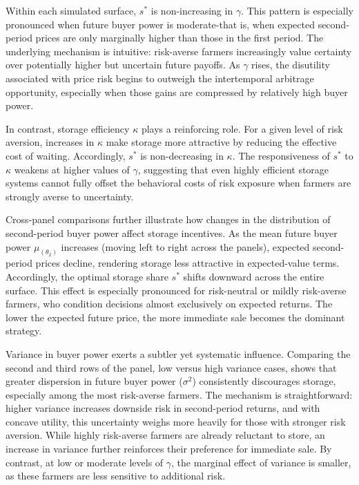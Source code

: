 Within each simulated surface, $s^*$ is non-increasing in $\gamma$. This pattern is especially pronounced when future buyer power is moderate-that is, when expected second-period prices are only marginally higher than those in the first period. The underlying mechanism is intuitive: risk-averse farmers increasingly value certainty over potentially higher but uncertain future payoffs. As $\gamma$ rises, the disutility associated with price risk begins to outweigh the intertemporal arbitrage opportunity, especially when those gains are compressed by relatively high buyer power.



In contrast, storage efficiency $\kappa$ plays a reinforcing role. For a given level of risk aversion, increases in $\kappa$ make storage more attractive by reducing the effective cost of waiting. Accordingly, $s^*$ is non-decreasing in $\kappa$. The responsiveness of $s^*$ to $\kappa$ weakens at higher values of $\gamma$, suggesting that even highly efficient storage systems cannot fully offset the behavioral costs of risk exposure when farmers are strongly averse to uncertainty. 


Cross-panel comparisons further illustrate how changes in the distribution of second-period buyer power affect storage incentives. As the mean future buyer power $\mu_{(\theta_2)}$ increases (moving left to right across the panels), expected second-period prices decline, rendering storage less attractive in expected-value terms. Accordingly, the optimal storage share $s^*$ shifts downward across the entire surface. This effect is especially pronounced for risk-neutral or mildly risk-averse farmers, who condition decisions almost exclusively on expected returns. The lower the expected future price, the more immediate sale becomes the dominant strategy.


Variance in buyer power exerts a subtler yet systematic influence. Comparing the second and third rows of the panel, low versus high variance cases, shows that greater dispersion in future buyer power ($\sigma^2$) consistently discourages storage, especially among the most risk-averse farmers. The mechanism is straightforward: higher variance increases downside risk in second-period returns, and with concave utility, this uncertainty weighs more heavily for those with stronger risk aversion. While highly risk-averse farmers are already reluctant to store, an increase in variance further reinforces their preference for immediate sale. By contrast, at low or moderate levels of $\gamma$, the marginal effect of variance is smaller, as these farmers are less sensitive to additional risk.



